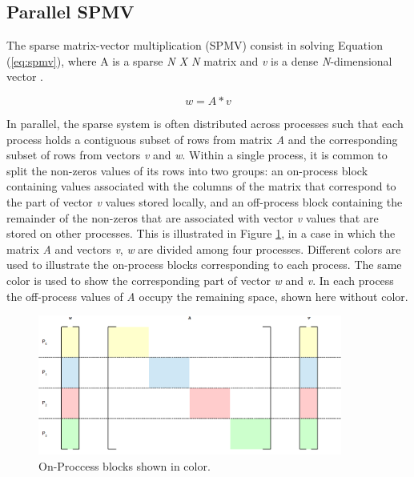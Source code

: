 \subsection*{Parallel SPMV}

The sparse matrix-vector multiplication (SPMV) consist in solving Equation (\ref{eq:spmv}), where A is a sparse \emph{N X N} matrix and \emph{v} is a dense \emph{N}-dimensional vector \cite{BienzGO16}.


\begin{equation}
  w = A * v
\label{eq:spmv}  
\end{equation}

In parallel, the sparse system is often distributed across processes such that each process holds a contiguous subset of rows from matrix \emph{A} and the corresponding subset of rows from vectors \emph{v} and \emph{w}. Within a single process, it is common to split the non-zeros values of its rows into two groups: an on-process block containing values associated with the columns of the matrix that correspond to the part of vector \emph{v} values stored locally, and an off-process block containing the remainder of the non-zeros that are associated with vector \emph{v} values that are stored on other processes\cite{BienzGO16}. This is illustrated in Figure \ref{fig:Matrix}, in a case in which the matrix \emph{A} and vectors \emph{v}, \emph{w} are divided among four processes. Different colors are used to illustrate the on-process blocks corresponding to each process. The same color is used to show the corresponding part of vector \emph{w} and \emph{v}. In each process the off-process values of \emph{A} occupy the remaining space, shown here without color.

\medskip

\begin{figure}[h!]
    \centering
    \includegraphics[width=100mm]{Plots/HybridProgramming/matrix.png}
    \caption{On-Proccess blocks shown in color.}
    \label{fig:Matrix}
\end{figure}

\medskip



